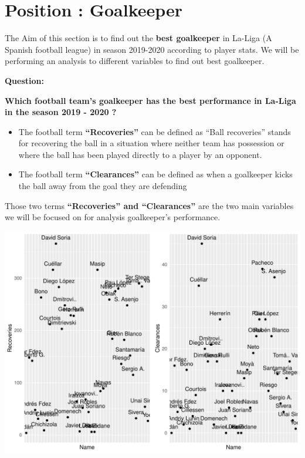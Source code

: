 \documentclass[11pt,a4paper,]{article}
\let\origfigure\figure
\let\endorigfigure\endfigure
\renewenvironment{figure}[1][2] {
    \expandafter\origfigure\expandafter[H]
} {
    \endorigfigure
}
\begin{document}
\hypertarget{position-goalkeeper}{%
\section{Position : Goalkeeper}\label{position-goalkeeper}}

The Aim of this section is to find out the \textbf{best goalkeeper} in La-Liga (A Spanish football league) in season 2019-2020 according to player stats. We will be performing an analysis to different variables to find out best goalkeeper.

\textbf{Question:}

\textbf{Which football team's goalkeeper has the best performance in La-Liga in the season 2019 - 2020 ?}

\begin{itemize}
\item
  The football term \textbf{``Recoveries''} can be defined as ``Ball recoveries'' stands for recovering the ball in a situation where neither team has possession or where the ball has been played directly to a player by an opponent.
\item
  The football term \textbf{``Clearances''} can be defined as when a goalkeeper kicks the ball away from the goal they are defending
\end{itemize}

Those two terms \textbf{``Recoveries'' and ``Clearances''} are the two main variables we will be focused on for analysis goalkeeper's performance.

\begin{figure}[H]

{\centering \includegraphics[width=0.8\linewidth]{Assignment-4-ETC5513_files/figure-latex/graph-data-1} 

}

\caption{Recoveries and Clearances}\label{fig:graph-data}
\end{figure}
\end{document}
